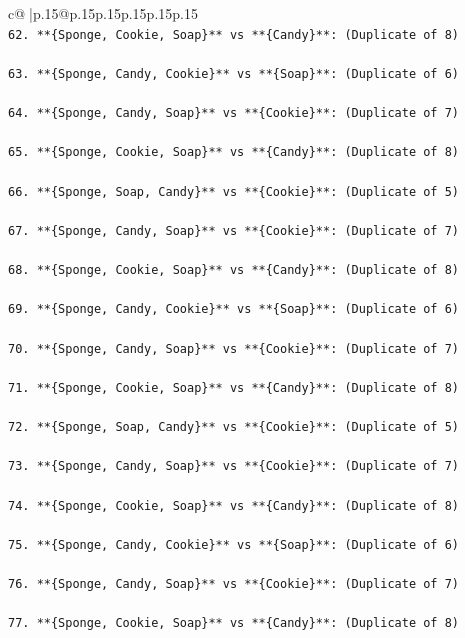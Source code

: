 \documentclass{article}
\begin{document}
{\begin{supertabular}{c@{$\;$}|p{.15\linewidth}@{}p{.15\linewidth}p{.15\linewidth}p{.15\linewidth}p{.15\linewidth}p{.15\linewidth}}
{{{\\ 
\texttt{62. **\{Sponge, Cookie, Soap\}** vs **\{Candy\}**: (Duplicate of 8)} \\
\\ 
\texttt{63. **\{Sponge, Candy, Cookie\}** vs **\{Soap\}**: (Duplicate of 6)} \\
\\ 
\texttt{64. **\{Sponge, Candy, Soap\}** vs **\{Cookie\}**: (Duplicate of 7)} \\
\\ 
\texttt{65. **\{Sponge, Cookie, Soap\}** vs **\{Candy\}**: (Duplicate of 8)} \\
\\ 
\texttt{66. **\{Sponge, Soap, Candy\}** vs **\{Cookie\}**: (Duplicate of 5)} \\
\\ 
\texttt{67. **\{Sponge, Candy, Soap\}** vs **\{Cookie\}**: (Duplicate of 7)} \\
\\ 
\texttt{68. **\{Sponge, Cookie, Soap\}** vs **\{Candy\}**: (Duplicate of 8)} \\
\\ 
\texttt{69. **\{Sponge, Candy, Cookie\}** vs **\{Soap\}**: (Duplicate of 6)} \\
\\ 
\texttt{70. **\{Sponge, Candy, Soap\}** vs **\{Cookie\}**: (Duplicate of 7)} \\
\\ 
\texttt{71. **\{Sponge, Cookie, Soap\}** vs **\{Candy\}**: (Duplicate of 8)} \\
\\ 
\texttt{72. **\{Sponge, Soap, Candy\}** vs **\{Cookie\}**: (Duplicate of 5)} \\
\\ 
\texttt{73. **\{Sponge, Candy, Soap\}** vs **\{Cookie\}**: (Duplicate of 7)} \\
\\ 
\texttt{74. **\{Sponge, Cookie, Soap\}** vs **\{Candy\}**: (Duplicate of 8)} \\
\\ 
\texttt{75. **\{Sponge, Candy, Cookie\}** vs **\{Soap\}**: (Duplicate of 6)} \\
\\ 
\texttt{76. **\{Sponge, Candy, Soap\}** vs **\{Cookie\}**: (Duplicate of 7)} \\
\\ 
\texttt{77. **\{Sponge, Cookie, Soap\}** vs **\{Candy\}**: (Duplicate of 8)} \\
}}}
\end{supertabular}}
\end{document}
